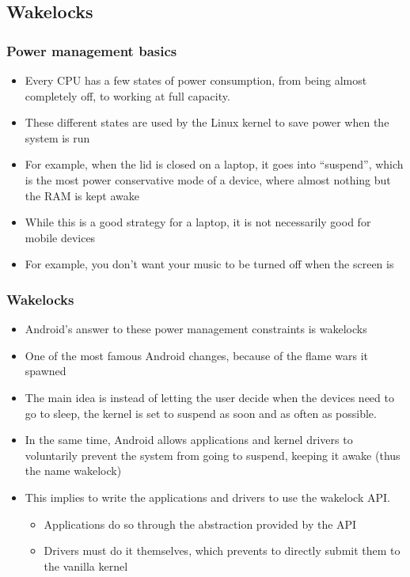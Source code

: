 \subsection{Wakelocks}
\begin{frame}
  \frametitle{Power management basics}
  \begin{itemize}
  \item Every CPU has a few states of power consumption, from being
    almost completely off, to working at full capacity.
  \item These different states are used by the Linux kernel to save
    power when the system is run
  \item For example, when the lid is closed on a laptop, it goes into
    ``suspend'', which is the most power conservative mode of a
    device, where almost nothing but the RAM is kept awake
  \item While this is a good strategy for a laptop, it is not
    necessarily good for mobile devices
  \item For example, you don't want your music to be turned off when
    the screen is
  \end{itemize}
\end{frame}

\begin{frame}
  \frametitle{Wakelocks}
  \begin{itemize}
  \item Android's answer to these power management constraints is wakelocks
  \item One of the most famous Android changes, because of the
    flame wars it spawned
  \item The main idea is instead of letting the user decide when
    the devices need to go to sleep, the kernel is set to suspend as
    soon and as often as possible.
  \item In the same time, Android allows applications and kernel
    drivers to voluntarily prevent the system from going to suspend,
    keeping it awake (thus the name wakelock)
  \item This implies to write the applications and drivers to use the
    wakelock API.
    \begin{itemize}
    \item Applications do so through the abstraction provided by the
      API
    \item Drivers must do it themselves, which prevents to directly
      submit them to the vanilla kernel
    \end{itemize}
  \end{itemize}
\end{frame}

